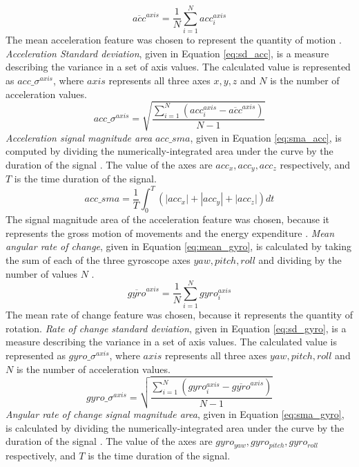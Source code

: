 \begin{equation}\label{eq:mean_acc}
\overline{acc}^{axis} = \frac{1}{N}\sum_{i=1}^{N}acc^{axis}_i
\end{equation}
The mean acceleration feature was chosen to represent the quantity of motion \cite{Arif2015}.
\emph{Acceleration Standard deviation}, given in Equation \ref{eq:sd_acc}, is a measure describing the variance in a set of axis values. The calculated value is represented as $acc\_\sigma^{axis}$, where $axis$ represents all three axes $x,y,z$ and $N$ is the number of acceleration values.
\begin{equation}\label{eq:sd_acc}
acc\_\sigma^{axis} = \sqrt{\frac{\sum_{i=1}^{N}(acc^{axis}_i - \overline{acc}^{axis})}{N - 1}}
\end{equation}
\emph{Acceleration signal magnitude area} $acc\_sma$, given in Equation \ref{eq:sma_acc}, is computed by dividing the numerically-integrated area under the curve by the duration of the signal \cite{Totty2017}. The value of the axes are $acc_x,acc_y,acc_z$ respectively, and $T$ is the time duration of the signal.
\begin{equation}\label{eq:sma_acc}
acc\_sma = \frac{1}{T}\int_{0}^{T}(|acc_x|+|acc_y|+|acc_z|)dt
\end{equation}
The signal magnitude area of the acceleration feature was chosen, because it represents the gross motion of movements and the energy expenditure \cite{Jeran2016}. \emph{Mean angular rate of change}, given in Equation \ref{eq:mean_gyro}, is calculated by taking the sum of each of the three gyroscope axes $yaw, pitch, roll$ and dividing by the number of values $N$ \cite{Totty2017}.
\begin{equation}\label{eq:mean_gyro}
\overline{gyro}^{axis} = \frac{1}{N}\sum_{i=1}^{N}gyro^{axis}_i
\end{equation}
The mean rate of change feature was chosen, because it represents the quantity of rotation.
\emph{Rate of change standard deviation}, given in Equation \ref{eq:sd_gyro}, is a measure describing the variance in a set of axis values. The calculated value is represented as $gyro\_\sigma^{axis}$, where $axis$ represents all three axes $yaw,pitch,roll$ and $N$ is the number of acceleration values.
\begin{equation}\label{eq:sd_gyro}
gyro\_\sigma^{axis} = \sqrt{\frac{\sum_{i=1}^{N}(gyro^{axis}_i - \overline{gyro}^{axis})}{N - 1}}
\end{equation}
\emph{Angular rate of change signal magnitude area}, given in Equation \ref{eq:sma_gyro}, is calculated by dividing the numerically-integrated area under the curve by the duration of the signal \cite{Totty2017}. The value of the axes are $gyro_{yaw},gyro_{pitch},gyro_{roll}$ respectively, and $T$ is the time duration of the signal.
